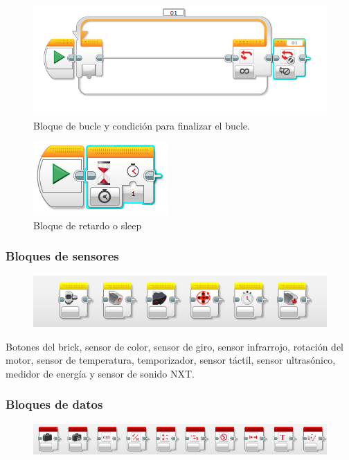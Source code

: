 \documentclass[12pt,a4paper]{article}
\begin{document}
\begin{figure}[H]
	\caption{Bloque de bucle y condición para finalizar el bucle.}
	\includegraphics{bucle.PNG}
	\centering
\end{figure}

\begin{figure}[H]
	\caption{Bloque de retardo o sleep}
	\includegraphics{sleep.PNG}
	\centering
\end{figure}

\subsubsection{Bloques de sensores}

\begin{figure}[H]
	\includegraphics[scale=0.8]{sensores.PNG}
	\centering
\end{figure}

Botones del brick, sensor de color, sensor de giro, sensor infrarrojo, rotación del
motor, sensor de temperatura, temporizador, sensor táctil, sensor ultrasónico,
medidor de energía y sensor de sonido NXT.

\subsubsection{Bloques de datos}

\begin{figure}[H]
	\includegraphics[scale=0.8]{operaciones.PNG}
	\centering
\end{figure}
\end{document}
